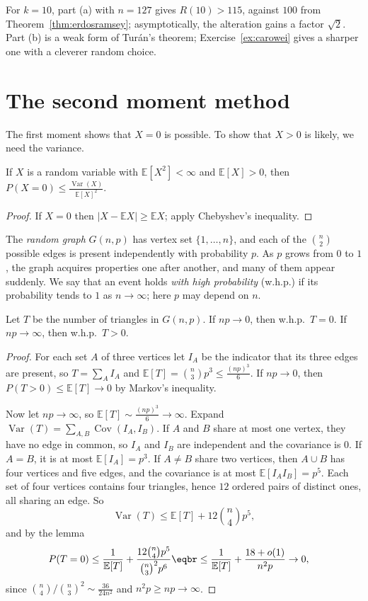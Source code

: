 For $k=10$, part (a) with $n=127$ gives $R(10)>115$, against $100$ from Theorem~\ref{thm:erdosramsey}; asymptotically, the alteration gains a factor $\sqrt2$.
Part (b) is a weak form of Tur\'an's theorem; Exercise~\ref{ex:carowei} gives a sharper one with a cleverer random choice.

\section{The second moment method}

The first moment shows that $X=0$ is possible. To show that $X>0$ is likely, we need the variance.

\begin{lemma}\label{lem:secondmoment}
If $X$ is a random variable with $\mathbb E[X^2]<\infty$ and $\mathbb E[X]>0$, then $P(X=0)\le\frac{\operatorname{Var}(X)}{\mathbb E[X]^2}$.
\end{lemma}
\begin{proof}
If $X=0$ then $|X-\mathbb E X|\ge\mathbb E X$; apply Chebyshev's inequality.
\end{proof}

The \emph{random graph} $G(n,p)$ has vertex set $\{1,\dots,n\}$, and each of the $\binom n2$ possible edges is present independently with probability $p$.
As $p$ grows from $0$ to $1$, the graph acquires properties one after another, and many of them appear suddenly. We
say that an event holds \emph{with high probability} (w.h.p.) if its probability tends to $1$ as $n\to\infty$; here $p$ may depend on $n$.

\begin{theorem}\label{thm:triangles}
Let $T$ be the number of triangles in $G(n,p)$. If $np\to0$, then w.h.p.\ $T=0$. If $np\to\infty$, then w.h.p.\ $T>0$.
\end{theorem}
\begin{proof}
For each set $A$ of three vertices let $I_A$ be the indicator that its three edges are present, so $T=\sum_AI_A$ and $\mathbb E[T]=\binom n3p^3\le\frac{(np)^3}6$. If $np\to0$,
then $P(T>0)\le\mathbb E[T]\to0$ by Markov's inequality.

Now let $np\to\infty$, so $\mathbb E[T]\sim\frac{(np)^3}6\to\infty$. Expand $\operatorname{Var}(T)=\sum_{A,B}\operatorname{Cov}(I_A,I_B)$. If $A$ and $B$ share at most one vertex, they have no edge in
common, so $I_A$ and $I_B$ are independent and the covariance is $0$. If $A=B$, it is at most $\mathbb E[I_A]=p^3$. If $A\ne B$ share two vertices, then
$A\cup B$ has four vertices and five edges, and the covariance is at most $\mathbb E[I_AI_B]=p^5$. Each set of four vertices contains four triangles, hence
$12$ ordered pairs of distinct ones, all sharing an edge. So
\[
\operatorname{Var}(T)\le\mathbb E[T]+12\binom n4p^5,
\]
and by the lemma
\[
\begin{aligned}P(T=0)&\le\frac1{\mathbb E[T]}+\frac{12\binom n4p^5}{\binom n3^2p^6}\eqbr\le\frac1{\mathbb E[T]}+\frac{18+o(1)}{n^2p}\to0,\end{aligned}
\]
since $\binom n4\big/\binom n3^2\sim\frac{36}{24n^2}$ and $n^2p\ge np\to\infty$.
\end{proof}

